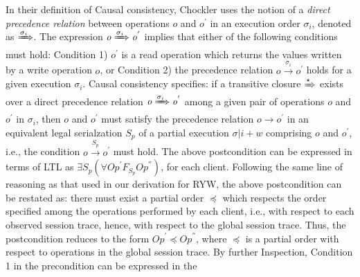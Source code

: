 \documentclass[acmlarge, ,11pt]{acmart}
\begin{document}
\par In their definition of Causal consistency, Chockler uses the notion of a
\emph{direct precedence relation} between operations $\mathit{o}$
 and $\mathit{o}^{'} $ in an execution order $\sigma_i$, denoted as $\xRightarrow{\sigma_i}$. The expression $\mathit{o} \xRightarrow{\sigma_i} \mathit{o}^{'} $
  implies that either of the following conditions must hold: Condition 1) $\mathit{o}^{'} $ is a read operation which returns the values written by a write operation $\mathit{o}$, or Condition 2)  %
 the precedence relation
$\mathit{o} \xrightarrow{\sigma_i} \mathit{o}^{'} $  holds for a given execution $\sigma_i$. Causal consistency specifies: if a transitive closure  $\xRightarrow{\star}$ exists
  over a direct precedence relation $\mathit{o} \xRightarrow{\sigma_i} \mathit{o}^{'}$ among a given pair of operations $\mathit{o}$  and $\mathit{o}^{'} $ in $\sigma_i$, %
  then $\mathit{o}$  and $\mathit{o}^{'} $ must satisfy the precedence relation $\mathit{o} \rightarrow \mathit{o}^{'}$ in an equivalent legal serialzation $S_p$ of a partial execution $\sigma |i + w$ comprising $\mathit{o}$  and $\mathit{o}^{'} $, i.e., the condition $\mathit{o} \xrightarrow{S_p}\mathit{o}^{'} $ must hold. %
 The above postcondition can be expressed in terms of LTL as  $\exists S_p \left( \forall \mathit{Op}^{'} F_{S_p} \mathit{Op}^{''} \right)$, for each client.  %
  Following the same line of reasoning as that  used in our derivation for RYW, the above postcondition can be restated as: there must exist a partial order $\preccurlyeq$ which respects the order specified among the operations performed by each client, i.e., with respect to each observed session trace, hence, with respect to the global session trace. Thus, the postcondition reduces to the form ${\mathit{Op}}^{'}  \preccurlyeq {\mathit{Op}}^{''}  $, where $\preccurlyeq$ is a partial order with respect to operations in the global session trace.  By further Inspection, Condition 1 in the precondition can be expressed in the
\end{document}

